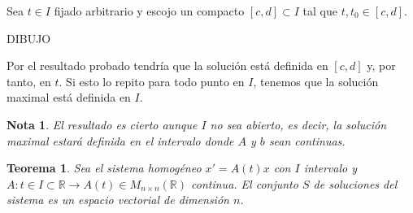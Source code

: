 \documentclass{article}
\makeatletter
\theoremstyle{theorem-style}  %
\newtheorem{theorem}{Teorema}[section]  %
\theoremstyle{definition-style}
\newtheorem*{note}{Nota} %
\theoremstyle{example-style}
\renewenvironment{proof}[1][\proofname]{\par
	\pushQED{\qed}%
	\normalfont \topsep6\p@\@plus6\p@\relax
	\list{}{%
		\settowidth{\leftmargin}{\quad:\hskip\labelsep}%
		\setlength{\labelwidth}{0pt}%
		\setlength{\itemindent}{-\leftmargin}%
	}%
	\item[\hskip\labelsep\itshape#1\@addpunct{:}]\ignorespaces
}{%
	\popQED\endlist\@endpefalse
}
\makeatother
\begin{document}
\begin{proof}
	Sea $t \in I$ fijado arbitrario y escojo un compacto $[c, d]\subset I$ tal que $t, t_0 \in [c, d]$. \\
	\begin{center}
		DIBUJO
	\end{center}
	Por el resultado probado tendría que la solución está definida en $[c, d]$ y, por tanto, en $t$. Si esto lo repito para todo punto en $I$, tenemos que la solución maximal está definida en $I$.
\end{proof}
\begin{note}
	El resultado es cierto aunque $I$ no sea abierto, es decir, la solución maximal estará definida en el intervalo donde $A$ y $b$ sean continuas.
\end{note}
\begin{theorem}
	Sea el sistema homogéneo $x' = A(t) x$ con $I$ intervalo y $A: t \in I \subset \mathbb{R} \longrightarrow A(t) \in M_{n \times n} (\mathbb{R})$ continua. El conjunto $S$ de soluciones del sistema es un espacio vectorial de dimensión $n$.
\end{theorem}
\end{document}
